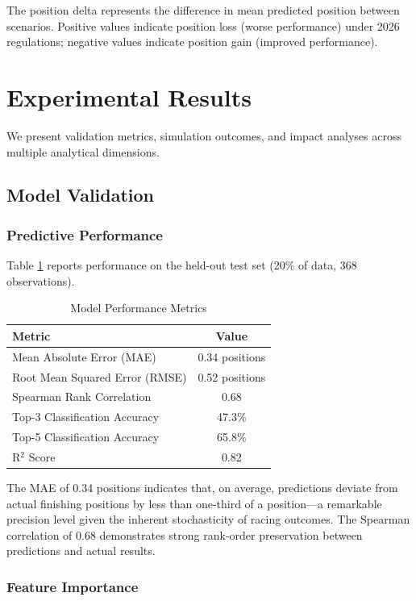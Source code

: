 \documentclass[conference]{IEEEtran}
\begin{document}
The position delta represents the difference in mean predicted position between scenarios. Positive values indicate position loss (worse performance) under 2026 regulations; negative values indicate position gain (improved performance).

\section{Experimental Results}

We present validation metrics, simulation outcomes, and impact analyses across multiple analytical dimensions.

\subsection{Model Validation}

\subsubsection{Predictive Performance}

Table \ref{tab:model_metrics} reports performance on the held-out test set (20\% of data, 368 observations).

\begin{table}[h]
\centering
\caption{Model Performance Metrics}
\begin{tabular}{lc}
\toprule
\textbf{Metric} & \textbf{Value} \\
\midrule
Mean Absolute Error (MAE) & 0.34 positions \\
Root Mean Squared Error (RMSE) & 0.52 positions \\
Spearman Rank Correlation & 0.68 \\
Top-3 Classification Accuracy & 47.3\% \\
Top-5 Classification Accuracy & 65.8\% \\
R$^2$ Score & 0.82 \\
\bottomrule
\end{tabular}
\label{tab:model_metrics}
\end{table}

The MAE of 0.34 positions indicates that, on average, predictions deviate from actual finishing positions by less than one-third of a position—a remarkable precision level given the inherent stochasticity of racing outcomes. The Spearman correlation of 0.68 demonstrates strong rank-order preservation between predictions and actual results.

\subsubsection{Feature Importance}
\end{document}

